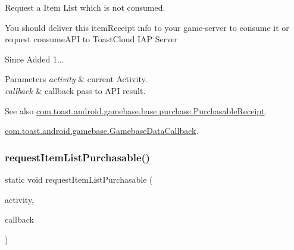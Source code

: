 Request a Item List which is not consumed. 

You should deliver this item\+Receipt info to your game-\/server to consume it or request consume\+A\+PI to Toast\+Cloud I\+AP Server

\begin{DoxySince}{Since}
Added 1... 
\end{DoxySince}

\begin{DoxyParams}{Parameters}
{\em activity} & current Activity. \\
\hline
{\em callback} & callback pass to A\+PI result. \\
\hline
\end{DoxyParams}
\begin{DoxySeeAlso}{See also}
\hyperlink{classcom_1_1toast_1_1android_1_1gamebase_1_1base_1_1purchase_1_1_purchasable_receipt}{com.\+toast.\+android.\+gamebase.\+base.\+purchase.\+Purchasable\+Receipt}. 

\hyperlink{interfacecom_1_1toast_1_1android_1_1gamebase_1_1_gamebase_data_callback}{com.\+toast.\+android.\+gamebase.\+Gamebase\+Data\+Callback}. 
\end{DoxySeeAlso}
\mbox{\label{classcom_1_1toast_1_1android_1_1gamebase_1_1_gamebase_1_1_purchase_a1969094885ffc1de17304f7aaf7cd4c9}} 
\subsubsection{\texorpdfstring{request\+Item\+List\+Purchasable()}{requestItemListPurchasable()}}
{\footnotesize\ttfamily static void request\+Item\+List\+Purchasable (\begin{DoxyParamCaption}\item[{@Non\+Null final Activity}]{activity,  }\item[{@Non\+Null final \hyperlink{interfacecom_1_1toast_1_1android_1_1gamebase_1_1_gamebase_data_callback}{Gamebase\+Data\+Callback}$<$ List$<$ \hyperlink{classcom_1_1toast_1_1android_1_1gamebase_1_1base_1_1purchase_1_1_purchasable_item}{Purchasable\+Item} $>$$>$}]{callback }\end{DoxyParamCaption})\hspace{0.3cm}{\ttfamily [static]}}



